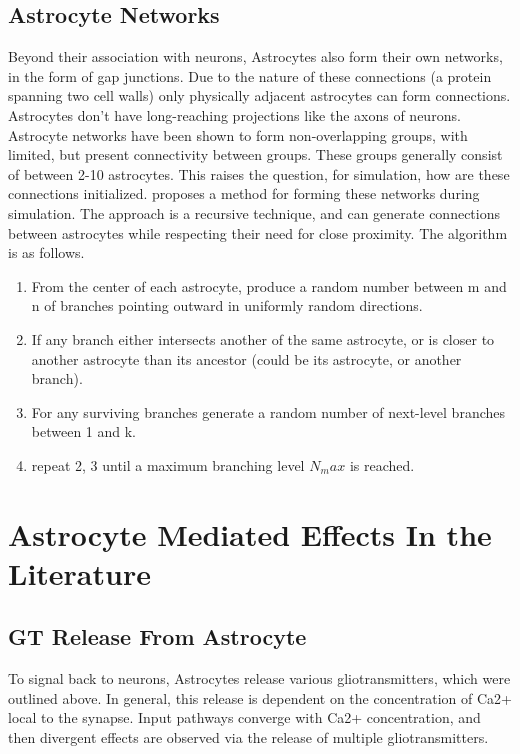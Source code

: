     \subsection{Astrocyte Networks}
    Beyond their association with neurons, Astrocytes also form their own
    networks, in the form of gap junctions. Due to the nature of these
    connections (a protein spanning two cell walls) only physically adjacent
    astrocytes can form connections. Astrocytes don't have long-reaching
    projections like the axons of neurons. Astrocyte networks have been shown to
    form non-overlapping groups, with limited, but present connectivity between
    groups. These groups generally consist of between 2-10 astrocytes. This
    raises the question, for simulation, how are these connections
    initialized. \cite{snn_dynamic_calcium} proposes a method for forming these
    networks during simulation. The approach is a recursive technique, and can
    generate connections between astrocytes while respecting their need for
    close proximity. The algorithm is as follows.
    \begin{enumerate}
        \item From the center of each astrocyte, produce a random number between
          m and n of branches pointing outward in uniformly random directions.
        \item If any branch either intersects another of the same astrocyte, or
          is closer to another astrocyte than its ancestor (could be its
          astrocyte, or another branch).\
        \item For any surviving branches generate a random number of next-level
          branches between 1 and k.
        \item repeat 2, 3 until a maximum branching level $N_max$ is reached.
    \end{enumerate}
    
    
    \section{Astrocyte Mediated Effects In the Literature}
    \subsection{GT Release From Astrocyte}
    To signal back to neurons, Astrocytes release various gliotransmitters,
    which were outlined above. In general, this release is dependent on the
    concentration of Ca2+ local to the synapse. Input pathways converge with
    Ca2+ concentration, and then divergent effects are observed via the release
    of multiple gliotransmitters.

